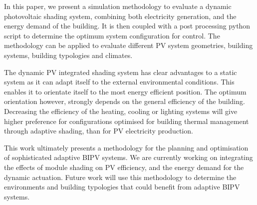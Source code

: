 
In this paper, we present a simulation methodology to evaluate a dynamic photovoltaic shading system, combining both electricity generation, and the energy demand of the building. It is then coupled with a post processing python script to determine the optimum system configuration for control. The methodology can be applied to evaluate different PV system geometries, building systems, building typologies and climates.

The dynamic PV integrated shading system has clear advantages to a static system as it can adapt itself to the external environmental conditions. This enables it to orientate itself to the most energy efficient position. The optimum orientation however, strongly depends on the general efficiency of the building. Decreasing the efficiency of the heating, cooling or lighting systems will give higher preference for configurations optimised for building thermal management through adaptive shading, than for PV electricity production.


This work ultimately presents a methodology for the planning and optimisation of sophisticated adaptive BIPV systems. We are currently working on integrating the effects of module shading on PV efficiency, and the energy demand for the dynamic actuation. Future work will use this methodology to determine the environments and building typologies that could benefit from adaptive BIPV systems. 



